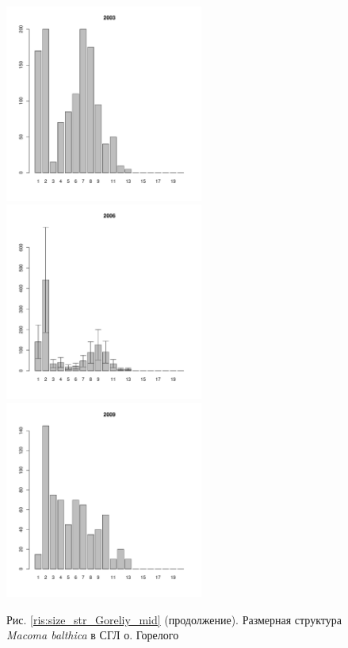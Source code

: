 \documentclass[12pt, a4paper]{article}
\begin{document}
\begin{figure}[h]
\begin{multicols}{3}
\hfill
\includegraphics[width=65mm]{../White_Sea/Luvenga_Goreliy/middle_2003_.pdf}
\hfill
\includegraphics[width=65mm]{../White_Sea/Luvenga_Goreliy/middle_2006_.pdf}
\hfill
\includegraphics[width=65mm]{../White_Sea/Luvenga_Goreliy/middle_2009_.pdf}
\end{multicols}



\begin{center}
Рис. \ref{ris:size_str_Goreliy_mid} (продолжение). Размерная структура {\it Macoma balthica} в СГЛ о. Горелого

\end{center}
\end{figure}
\end{document}
